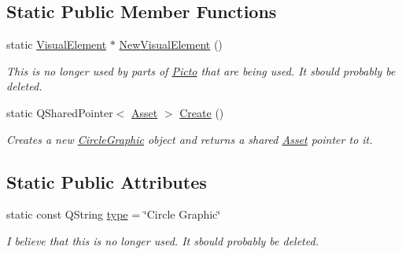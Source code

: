 \subsection*{Static Public Member Functions}
\begin{DoxyCompactItemize}
\item 
\hypertarget{class_picto_1_1_circle_graphic_a08f0625d8cac7b6e6aea72f0d9dd8442}{static \hyperlink{struct_picto_1_1_visual_element}{Visual\-Element} $\ast$ \hyperlink{class_picto_1_1_circle_graphic_a08f0625d8cac7b6e6aea72f0d9dd8442}{New\-Visual\-Element} ()}\label{class_picto_1_1_circle_graphic_a08f0625d8cac7b6e6aea72f0d9dd8442}

\begin{DoxyCompactList}\small\item\em This is no longer used by parts of \hyperlink{namespace_picto}{Picto} that are being used. It sbould probably be deleted. \end{DoxyCompactList}\item 
\hypertarget{class_picto_1_1_circle_graphic_af8ec9f14455d2f1ec01bc5d8d80f520f}{static Q\-Shared\-Pointer$<$ \hyperlink{class_picto_1_1_asset}{Asset} $>$ \hyperlink{class_picto_1_1_circle_graphic_af8ec9f14455d2f1ec01bc5d8d80f520f}{Create} ()}\label{class_picto_1_1_circle_graphic_af8ec9f14455d2f1ec01bc5d8d80f520f}

\begin{DoxyCompactList}\small\item\em Creates a new \hyperlink{class_picto_1_1_circle_graphic}{Circle\-Graphic} object and returns a shared \hyperlink{class_picto_1_1_asset}{Asset} pointer to it. \end{DoxyCompactList}\end{DoxyCompactItemize}
\subsection*{Static Public Attributes}
\begin{DoxyCompactItemize}
\item 
\hypertarget{class_picto_1_1_circle_graphic_a670342e0f64c5acb5ee4cdd5ed244aee}{static const Q\-String \hyperlink{class_picto_1_1_circle_graphic_a670342e0f64c5acb5ee4cdd5ed244aee}{type} = \char`\"{}Circle Graphic\char`\"{}}\label{class_picto_1_1_circle_graphic_a670342e0f64c5acb5ee4cdd5ed244aee}

\begin{DoxyCompactList}\small\item\em I believe that this is no longer used. It sbould probably be deleted. \end{DoxyCompactList}\end{DoxyCompactItemize}
